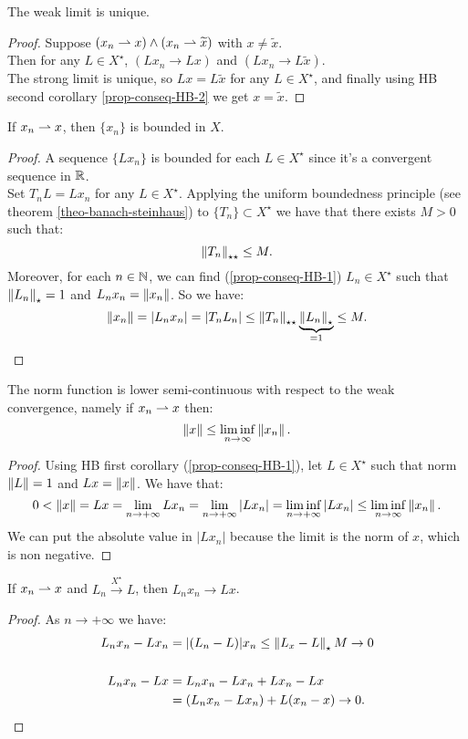 \begin{prop}
	The weak limit is unique.
\end{prop}
\begin{proof}
	Suppose $(x_n \rightharpoonup x) \wedge (x_n \rightharpoonup \widetilde x)$ with $x \neq \tilde x$.\\
	Then for any $L \in X^\star$, $(Lx_n \to L x )$ and $(Lx_n \to L\tilde x)$.\\
	The strong limit is unique, so $Lx = L\tilde x$ for any $L \in X^\star$, and finally using HB second corollary \vref{prop-conseq-HB-2} we get $x = \tilde x$.
\end{proof}

\begin{prop}
	If $x_n \rightharpoonup x$, then $\{x_n\}$ is bounded in $X$.
\end{prop}
\begin{proof}
	A sequence $\{Lx_n\}$ is bounded for each $L \in X^\star$ since it's a convergent sequence in $\mathbb R$.\\
	Set $T_n L = L x_n$ for any $L \in X^\star$.
	Applying the uniform boundedness principle (see theorem \vref{theo-banach-steinhaus}) to $\{T_n\} \subset X^\star$ we have that there exists $M>0$ such that: $$\left\lVert T_n\right\rVert_{\star\star} \leq M.$$
	Moreover, for each $n \in \mathbb N$, we can find (\vref{prop-conseq-HB-1}) $L_n \in X^\star$ such that $\left\lVert L_n\right\rVert_\star = 1$ and $L_nx_n = \left\lVert x_n\right\rVert$.
	So we have: $$\left\lVert x_n\right\rVert= |L_nx_n| = |T_nL_n| \leq \left\lVert T_n\right\rVert_{\star\star} \underbrace{\left\lVert L_n\right\rVert_\star}_{=1} \leq M.$$
\end{proof}

\begin{prop}
	The norm function is lower semi-continuous with respect to the weak convergence, namely if $x_n \rightharpoonup x$ then: $$\left\lVert x\right\rVert \leq \liminf\limits_{n\to\infty} \left\lVert x_n\right\rVert.$$
\end{prop}
\begin{proof}
	Using HB first corollary (\vref{prop-conseq-HB-1}), let $L \in X^\star$ such that norm $\left\lVert L\right\rVert = 1$ and $Lx = \left\lVert x\right\rVert$. We have that:
	$$0 < \left\lVert x\right\rVert = L x
	= \lim_{n\to +\infty}L x_n
	= \lim_{n\to +\infty}|L x_n|
	= \liminf_{n\to +\infty}|L x_n|\leq \liminf_{n\to\infty}\left\lVert x_n\right\rVert.$$
	We can put the absolute value in $|Lx_n|$ because the limit is the norm of $x$, which is non negative.
\end{proof}

\begin{prop}
	If $x_n \rightharpoonup x$ and $L_n \xrightarrow{X^\star} L$, then $L_n x_n \to L x$.
\end{prop}
\begin{proof} As $n \to +\infty$ we have:
	\begin{align*}
		L_n x_n - L x_n &= |(L_n-L)|x_n \leq \left\lVert L_x -L\right\rVert_\star M \to 0 \\
		&\\
		L_n x_n - Lx &= L_n x_n - L x_n + Lx_n - Lx \\
		&= (L_n x_n - L x_n) + L(x_n - x) \to 0.
	\end{align*}
\end{proof}

